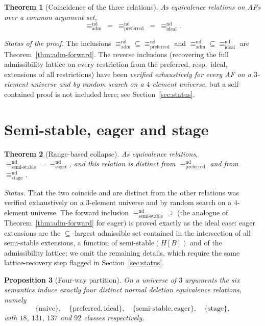 \documentclass{amsart}
\newtheorem{theorem}{Theorem}
\newtheorem{proposition}[theorem]{Proposition}
\theoremstyle{remark}
\begin{document}
\begin{theorem}[Coincidence of the three relations]\label{thm:adm-equal}
As equivalence relations on AFs over a common argument set,
\[
\equiv^{\mathrm{nd}}_{\mathrm{adm}}\ =\
\equiv^{\mathrm{nd}}_{\mathrm{preferred}}\ =\
\equiv^{\mathrm{nd}}_{\mathrm{ideal}}.
\]
\end{theorem}

\noindent\emph{Status of the proof.}  The inclusions
$\equiv^{\mathrm{nd}}_{\mathrm{adm}}\subseteq
\equiv^{\mathrm{nd}}_{\mathrm{preferred}}$ and
$\equiv^{\mathrm{nd}}_{\mathrm{adm}}\subseteq
\equiv^{\mathrm{nd}}_{\mathrm{ideal}}$ are Theorem~\ref{thm:adm-forward}.  The
reverse inclusions (recovering the full admissibility lattice on every
restriction from the preferred, resp.\ ideal, extensions of all restrictions)
have been \emph{verified exhaustively for every AF on a $3$-element universe and
by random search on a $4$-element universe}, but a self-contained proof is not
included here; see Section~\ref{sec:status}.

\section{Semi-stable, eager and stage}

\begin{theorem}[Range-based collapse]\label{thm:ss-eager}
As equivalence relations,
$\equiv^{\mathrm{nd}}_{\mathrm{semi\text{-}stable}}=
\equiv^{\mathrm{nd}}_{\mathrm{eager}}$, and this relation is distinct from
$\equiv^{\mathrm{nd}}_{\mathrm{preferred}}$ and from
$\equiv^{\mathrm{nd}}_{\mathrm{stage}}$.
\end{theorem}

\noindent\emph{Status.}  That the two coincide and are distinct from the other
relations was verified exhaustively on a $3$-element universe and by random
search on a $4$-element universe.  The forward inclusion
$\equiv^{\mathrm{nd}}_{\mathrm{semi\text{-}stable}}\supseteq{}$
(the analogue of Theorem~\ref{thm:adm-forward} for eager) is proved exactly as
the ideal case: eager extensions are the $\subseteq$-largest admissible set
contained in the intersection of all semi-stable extensions, a function of
$\mathrm{semi\text{-}stable}(H[B])$ and of the admissibility lattice; we omit the
remaining details, which require the same lattice-recovery step flagged in
Section~\ref{sec:status}.

\begin{proposition}[Four-way partition]\label{prop:partition}
On a universe of $3$ arguments the six semantics induce exactly four distinct
normal deletion equivalence relations, namely
\[
\{\mathrm{naive}\},\quad
\{\mathrm{preferred},\mathrm{ideal}\},\quad
\{\mathrm{semi\text{-}stable},\mathrm{eager}\},\quad
\{\mathrm{stage}\},
\]
with $18$, $131$, $137$ and $92$ classes respectively.
\end{proposition}
\end{document}
